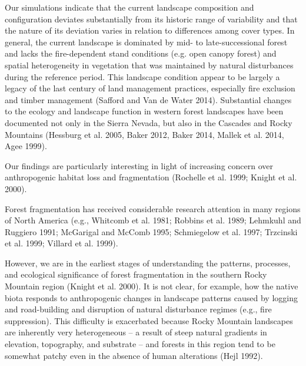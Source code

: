 Our simulations indicate that the current landscape composition and configuration deviates substantially from its historic range of variability and that the nature of its deviation varies in relation to differences among cover types. In general, the current landscape is dominated by mid- to late-successional forest and lacks the fire-dependent stand conditions (e.g. open canopy forest) and spatial heterogeneity in vegetation that was maintained by natural disturbances during the reference period. This landscape condition appear to be largely a legacy of the last century of land management practices, especially fire exclusion and timber management (Safford and Van de Water 2014). Substantial changes to the ecology and landscape function in western forest landscapes have been documented not only in the Sierra Nevada, but also in the Cascades and Rocky Mountains (Hessburg et al. 2005, Baker 2012, Baker 2014, Mallek et al. 2014, Agee 1999). 




Our findings are particularly interesting in light of increasing concern over anthropogenic habitat loss and fragmentation (Rochelle et al. 1999; Knight et al. 2000). 

Forest fragmentation has received considerable research attention in many regions of North America (e.g., Whitcomb et al. 1981; Robbins et al. 1989; Lehmkuhl and Ruggiero 1991; McGarigal and McComb 1995; Schmiegelow et al. 1997; Trzcinski et al. 1999; Villard et al. 1999). 


However, we are in the earliest stages of understanding the patterns, processes, and ecological significance of forest fragmentation in the southern Rocky Mountain region (Knight et al. 2000). It is not clear, for example, how the native biota responds to anthropogenic changes in landscape patterns caused by logging and road-building and disruption of natural disturbance regimes (e.g., fire suppression). This difficulty is exacerbated because Rocky Mountain landscapes are inherently very heterogeneous – a result of steep natural gradients in elevation, topography, and substrate – and forests in this region tend to be somewhat patchy even in the absence of human alterations (Hejl 1992).

